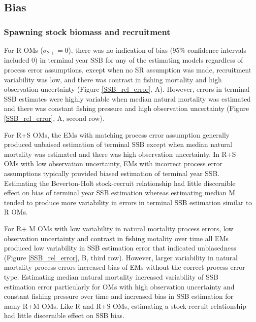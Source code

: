 \documentclass[
  12pt,
]{article}
\begin{document}
\hypertarget{bias-1}{%
\subsection*{Bias}\label{bias-1}}

\hypertarget{spawning-stock-biomass-and-recruitment}{%
\subsubsection*{Spawning stock biomass and
recruitment}\label{spawning-stock-biomass-and-recruitment}}

For R OMs (\(\sigma_{2+} = 0\)), there was no indication of bias (95\%
confidence intervals included 0) in terminal year SSB for any of the
estimating models regardless of process error assumptions, except when
no SR assumption was made, recruitment variability was low, and there
was contrast in fishing mortality and high observation uncertainty
(Figure \ref{SSB_rel_error}, A). However, errors in terminal SSB
estimates were highly variable when median natural mortality was
estimated and there was constant fishing pressure and high observation
uncertainty (Figure \ref{SSB_rel_error}, A, second row).

For R+S OMs, the EMs with matching process error assumption generally
produced unbaised estimation of terminal SSB except when median natural
mortality was estimated and there was high observation uncertainty. In
R+S OMs with low observation uncertainty, EMs with incorrect process
error assumptions typically provided biased estimation of terminal year
SSB. Estimating the Beverton-Holt stock-recruit relationship had little
discernible effect on bias of terminal year SSB estimation whereas
estimating median M tended to produce more variability in errors in
terminal SSB estimation similar to R OMs.

For R+ M OMs with low variability in natural mortality process errors,
low observation uncertainty and contrast in fishing motality over time
all EMs produced low variability in SSB estimation error that indicated
unbiasedness (Figure \ref{SSB_rel_error}, B, third row). However, larger
variability in natural mortality process errors increased bias of EMs
without the correct process error type. Estimating median natural
mortality increased variability of SSB estimation error particularly for
OMs with high observation uncertainty and constant fishing pressure over
time and increased bias in SSB estimation for many R+M OMs. Like R and
R+S OMs, estimating a stock-recruit relationship had little discernible
effect on SSB bias.
\end{document}
